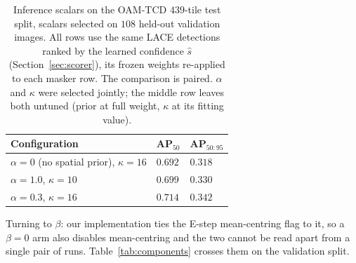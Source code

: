 \documentclass[remotesensing,article,submit,moreauthors]{Definitions/mdpi}
\begin{document}
\begin{table}[H]
\caption{Inference scalars on the OAM-TCD $439$-tile test split, scalars selected on $108$ held-out validation images. All rows use the same LACE detections ranked by the learned confidence $\hat s$ (Section~\ref{sec:scorer}), its frozen weights re-applied to each masker row. The comparison is paired. $\alpha$ and $\kappa$ were selected jointly; the middle row leaves both untuned (prior at full weight, $\kappa$ at its fitting value).\label{tab:masker}}
\begin{tabularx}{\textwidth}{lCC}
\toprule
\textbf{Configuration} & \textbf{AP$_{50}$} & \textbf{AP$_{50:95}$} \\
\midrule
$\alpha = 0$ (no spatial prior), $\kappa = 16$ & $0.692$ & $0.318$ \\
$\alpha = 1.0$, $\kappa = 10$ & $0.699$ & $0.330$ \\
$\alpha = 0.3$, $\kappa = 16$ & $\mathbf{0.714}$ & $\mathbf{0.342}$ \\
\bottomrule
\end{tabularx}
\end{table}

Turning to $\beta$: our implementation ties the E-step mean-centring flag to it, so a $\beta = 0$ arm also disables mean-centring and the two cannot be read apart from a single pair of runs. Table~\ref{tab:components} crosses them on the validation split.
\end{document}
